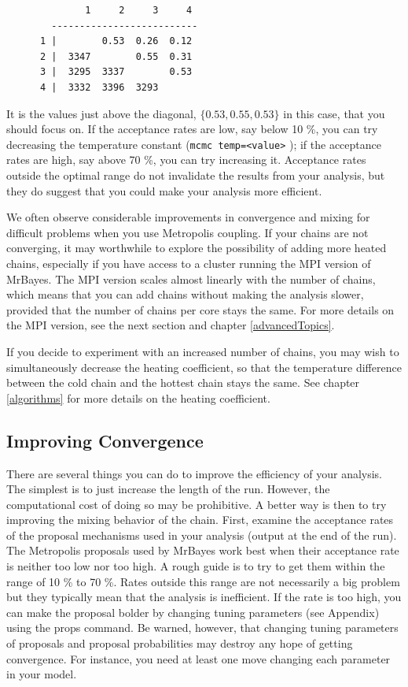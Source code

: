\documentclass[12pt]{book}
\newcommand{\ttt}[1]{\texttt{#1} }
\begin{document}
\small
\begin{singlespacing}
\begin{verbatim}
              1     2     3     4 
        --------------------------
      1 |        0.53  0.26  0.12 
      2 |  3347        0.55  0.31 
      3 |  3295  3337        0.53 
      4 |  3332  3396  3293       
\end{verbatim}
\end{singlespacing}
\normalsize

It is the values just above the diagonal, $\{0.53, 0.55, 0.53\}$ in this case, that you should
focus on. If the acceptance rates are low, say below 10 \%, you can try decreasing the temperature
constant (\ttt{mcmc temp=<value>}); if the acceptance rates are high, say above 70 \%, you can
try increasing it.  Acceptance rates outside the optimal range do not invalidate the results from
your analysis, but they do suggest that you could make your analysis more efficient.

We often observe considerable improvements in convergence and mixing for difficult problems when
you use Metropolis coupling. If your chains are not converging, it may worthwhile to explore the
possibility of adding more heated chains, especially if you have access to a cluster running the
MPI version of MrBayes.  The MPI version scales almost linearly with the number of chains, which
means that you can add chains without making the analysis slower, provided that the number of
chains per core stays the same. For more details on the MPI version, see the next section and
chapter \ref{advancedTopics}.

If you decide to experiment with an increased number of chains, you may wish to simultaneously
decrease the heating coefficient, so that the temperature difference between the cold chain and the
hottest chain stays the same. See chapter \ref{algorithms} for more details on the heating
coefficient.


\subsection{Improving Convergence}
There are several things you can do to improve the efficiency of your analysis. The simplest is to
just increase the length of the run. However, the computational cost of doing so may be
prohibitive. A better way is then to try improving the mixing behavior of the chain. First, examine
the acceptance rates of the proposal mechanisms used in your analysis (output at the end of the
run). The Metropolis proposals used by MrBayes work best when their acceptance rate is neither too
low nor too high. A rough guide is to try to get them within the range of 10 \% to 70 \%. Rates
outside this range are not necessarily a big problem but they typically mean that the analysis is
inefficient. If the rate is too high, you can make the proposal bolder by changing tuning
parameters (see Appendix) using the props command. Be warned, however, that changing tuning
parameters of proposals and proposal probabilities may destroy any hope of getting convergence. For
instance, you need at least one move changing each parameter in your model.
\end{document}

